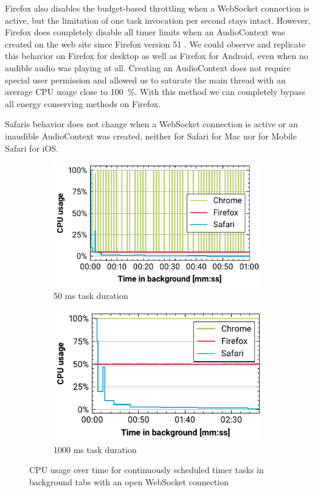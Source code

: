 \documentclass[
	ruledheaders=section,%
	class=report,%
	thesis={type=bachelor},%
	accentcolor=9c,%
	custommargins=true,%
	marginpar=false,%
	parskip=half-,%
	fontsize=11pt,%
]{tudapub}
\begin{document}
  Firefox also disables the budget-based throttling when a WebSocket connection is active, but the limitation of one task invocation per second stays intact. However, Firefox does completely disable all timer limits when an AudioContext was created on the web site since Firefox version 51 \cite{firefox-audiocontext-exemption}. We could observe and replicate this behavior on Firefox for desktop as well as Firefox for Android, even when no audible audio was playing at all. Creating an AudioContext does not require special user permission and allowed us to saturate the main thread with an average CPU usage close to 100~\%. With this method we can completely bypass all energy conserving methods on Firefox.

  Safaris behavior does not change when a WebSocket connection is active or an inaudible AudioContext was created, neither for Safari for Mac nor for Mobile Safari for iOS.

  \begin{figure}
    \begin{subfigure}[t]{0.5\textwidth}
      \includegraphics[width=\textwidth]{images/websocket-50.pdf}
      \caption{50 ms task duration}
    \end{subfigure}
    \hfill
    \begin{subfigure}[t]{0.5\textwidth}
      \includegraphics[width=\textwidth]{images/websocket-1000.pdf}
      \caption{1000 ms task duration}
    \end{subfigure}

    \caption{CPU usage over time for continuously scheduled timer tasks in background tabs with an open WebSocket connection}
    \label{fig:websocket}
  \end{figure}
\end{document}
